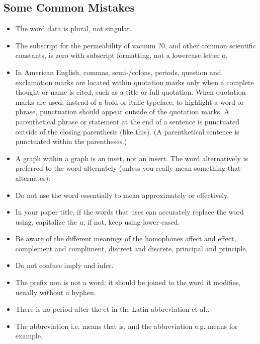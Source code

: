 \subsection{Some Common Mistakes}
\begin{itemize}


\item The word data is plural, not singular.
\item The subscript for the permeability of vacuum ?0, and other common scientific constants, is zero with subscript formatting, not a lowercase letter o.
\item In American English, commas, semi-/colons, periods, question and exclamation marks are located within quotation marks only when a complete thought or name is cited, such as a title or full quotation. When quotation marks are used, instead of a bold or italic typeface, to highlight a word or phrase, punctuation should appear outside of the quotation marks. A parenthetical phrase or statement at the end of a sentence is punctuated outside of the closing parenthesis (like this). (A parenthetical sentence is punctuated within the parentheses.)
\item A graph within a graph is an inset, not an insert. The word alternatively is preferred to the word alternately (unless you really mean something that alternates).
\item Do not use the word essentially to mean approximately or effectively.
\item In your paper title, if the words that uses can accurately replace the word using, capitalize the u; if not, keep using lower-cased.
\item Be aware of the different meanings of the homophones affect and effect, complement and compliment, discreet and discrete, principal and principle.
\item Do not confuse imply and infer.
\item The prefix non is not a word; it should be joined to the word it modifies, usually without a hyphen.
\item There is no period after the et in the Latin abbreviation et al..
\item The abbreviation i.e. means that is, and the abbreviation e.g. means for example.

\end{itemize}


